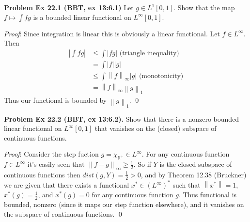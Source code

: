 \documentclass[12pt]{article}
\newcommand{\problem}[1]{\hspace{-4 ex} \large \textbf{Problem #1} }
\newcommand{\norm}[1]{\left\lVert#1\right\rVert}
\renewenvironment{proof}{\hspace{-4 ex} \emph{Proof}:}{\qed}
\newcommand{\RR}{\mathbb{R}}
\begin{document}
\bigbreak
\problem{Ex 22.1 (BBT, ex 13:6.1)} Let $g\in L^1[0,1]$. Show that the map $f\mapsto\int fg$ is a bounded linear functional on $L^\infty[0,1]$.

	\begin{proof}
		Since integration is linear this is obviously a linear functional. Let $f \in L^\infty$. Then
		\begin{align*}
			\left \vert \int fg \right \vert & \leq  \int  \vert fg \vert \text{\ \ (triangle inequality)}\\
			& = \int \vert f \vert \vert g \vert \\
			& \leq \int \norm{f}_\infty \vert g \vert \text{\ \ (monotonicity)}\\
			& = \norm{f}_\infty \norm{g}_1
		\end{align*}
		Thus our functional is bounded by $\norm{g}_1$.
	\end{proof}

\bigbreak
\problem{Ex 22.2 (BBT, ex 13:6.2).} Show that there is a nonzero bounded linear functional on $L^\infty[0,1]$ that vanishes on the (closed) subspace of continuous functions. \bigbreak

	\begin{proof}
		Consider the step fuction $g = \chi_{\RR^+} \in L^\infty$. For any continuous function $f \in L^\infty$ it's easily seen that $\norm{f - g}_\infty \geq \tfrac{1}{2}$. So if $Y$ is the closed subspace of continuous functions then $dist(g, Y) = \tfrac{1}{2} > 0$, and by Theorem 12.38 (Bruckner) we are given that there exists a functional $x^* \in (L^\infty)^*$ such that $\norm{x^*} = 1$, $x^*(g) = \tfrac{1}{2}$, and $x^*(g)=0$ for any continuous function $g$. Thus functional is bounded, nonzero (since it maps our step function elsewhere), and it vanishes on the subspace of continuous functions.
	\end{proof}
\end{document}
